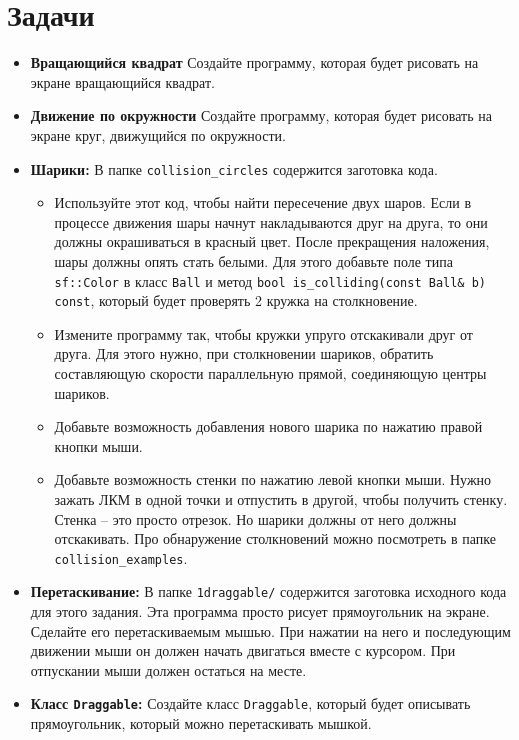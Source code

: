 \documentclass{article}
\begin{document}
\section{Задачи}
\begin{itemize}


\item \textbf{Вращающийся квадрат}
Создайте программу, которая будет рисовать на экране вращающийся квадрат.


\item \textbf{Движение по окружности}
Создайте программу, которая будет рисовать на экране круг, движущийся по окружности.

\item \textbf{Шарики:} В папке \texttt{collision\_circles} содержится заготовка кода. 
\begin{itemize}
\item Используйте этот код, чтобы найти пересечение двух шаров. Если в процессе движения шары начнут накладываются друг на друга, то они должны окрашиваться в красный цвет. После прекращения наложения, шары должны опять стать белыми. Для этого добавьте поле типа \texttt{sf::Color} в класс \texttt{Ball} и метод \texttt{bool is\_colliding(const Ball\& b) const}, который будет проверять 2 кружка на столкновение.
\item Измените программу так, чтобы кружки упруго отскакивали друг от друга. Для этого нужно, при столкновении шариков, обратить составляющую скорости параллельную прямой, соединяющую центры шариков.
\item Добавьте возможность добавления нового шарика по нажатию правой кнопки мыши.
\item Добавьте возможность стенки по нажатию левой кнопки мыши. Нужно зажать ЛКМ в одной точки и отпустить в другой, чтобы получить стенку. Стенка -- это просто отрезок. Но шарики должны от него должны отскакивать. Про обнаружение столкновений можно посмотреть в папке \texttt{collision\_examples}.
\end{itemize}


\item \textbf{Перетаскивание:} В папке \texttt{1draggable/} содержится заготовка исходного кода для этого задания. Эта программа просто рисует прямоугольник на экране. Сделайте его перетаскиваемым мышью. При нажатии на него и последующим движении мыши он должен начать двигаться вместе с курсором. При отпускании мыши должен остаться на месте.

\item \textbf{Класс \texttt{Draggable}:} Создайте класс \texttt{Draggable}, который будет описывать прямоугольник, который можно перетаскивать мышкой.



\end{itemize}
\end{document}
